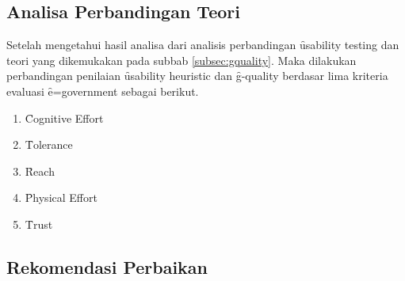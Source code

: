 \subsection{Analisa Perbandingan Teori}
Setelah mengetahui hasil analisa dari analisis perbandingan \f{usability testing} dan teori yang dikemukakan pada subbab \ref{subsec:gquality}. Maka dilakukan perbandingan penilaian \f{usability heuristic} dan \f{g-quality} berdasar lima kriteria evaluasi \f{e=government} sebagai berikut.

\begin{enumerate}
	\item \f{Cognitive Effort}\\
	\item \f{Tolerance}\\
	\item \f{Reach}\\
	\item \f{Physical Effort}\\
	\item \f{Trust}\\
\end{enumerate}
\subsection{Rekomendasi Perbaikan}
